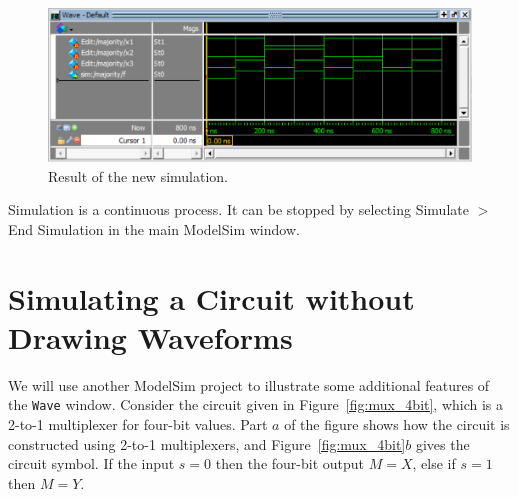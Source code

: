 \documentclass[11pt, twoside, pdftex]{article}
\begin{document}
\begin{figure}[H]
   \begin{center}
      \includegraphics[scale=1.0]{figures/figure30.png}
   \caption{Result of the new simulation.} 
	 \label{fig:30}
	 \end{center}
\end{figure}

\noindent
Simulation is a continuous process. It can be stopped by selecting 
{\sf Simulate $>$ End Simulation} in the main ModelSim window.

\newpage
\section{Simulating a Circuit without Drawing Waveforms}

We will use another ModelSim project to illustrate some additional features
of the \texttt{Wave} window.  Consider the circuit given in Figure~\ref{fig:mux_4bit}, 
which is a 2-to-1 multiplexer for four-bit values. Part $a$ of the figure shows how the
circuit is constructed using 2-to-1 multiplexers, and Figure~\ref{fig:mux_4bit}$b$ gives 
the circuit symbol.  If the input $s = 0$ then the four-bit output $M = X$, 
else if $s = 1$ then $M = Y$. 
\end{document}
